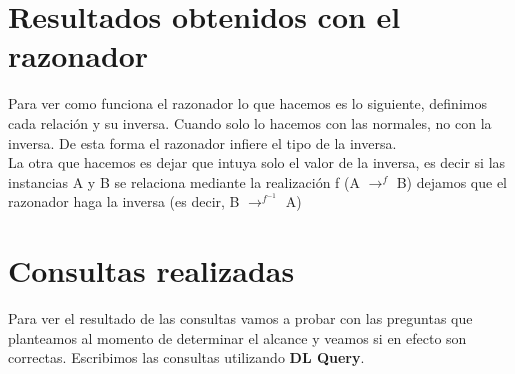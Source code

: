 \documentclass[12pt, titlepage, a4paper]{article}
\begin{document}
\section{Resultados obtenidos con el razonador}
Para ver como funciona el razonador lo que hacemos es lo siguiente, 
definimos cada relación y su inversa. Cuando  solo 
lo hacemos con las normales, no con la inversa. De esta forma el 
razonador infiere el tipo de la inversa.\\

La otra que hacemos es dejar que intuya solo el valor de la inversa, 
es decir si las instancias A y B se relaciona mediante la realización 
f (A $\rightarrow^f$ B) dejamos que el razonador haga la inversa 
(es decir, B $\rightarrow^{f^{-1}}$ A)


\section{Consultas realizadas}
Para ver el resultado de las consultas vamos a probar con las 
preguntas que planteamos al momento de determinar el alcance y 
veamos si en efecto son correctas. Escribimos las consultas utilizando
\textbf{DL Query}.
\end{document}
